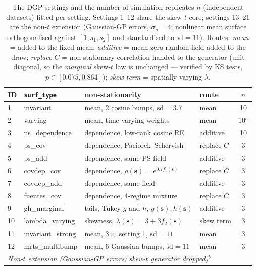 \documentclass[11pt]{article}
\newcommand{\bs}{\boldsymbol{s}}
\begin{document}
\begin{table}[ht]
\centering\small
\caption{The DGP settings and the number of simulation replicates
$n$ (independent datasets) fitted per setting. Settings 1--12 share the
skew-$t$ core; settings 13--21 are the non-$t$ extension (Gaussian-GP errors,
$\sigma_g = 4$; nonlinear mean surface orthogonalised against $[1,s_1,s_2]$
and standardised to $\mathrm{sd}=11$). Routes: \emph{mean} = added to
the fixed mean; \emph{additive} = mean-zero random field added to the draw;
\emph{replace $C$} = non-stationary correlation handed to the generator (unit
diagonal, so the \emph{marginal} skew-$t$ law is unchanged --- verified by KS
tests, $p \in [0.075, 0.864]$); \emph{skew term} = spatially varying $\lambda$.}
\label{tab:dgp}
\begin{tabular}{llllc}
\toprule
ID & \texttt{surf\_type} & non-stationarity & route & $n$ \\
\midrule
1  & invariant         & mean, 2 cosine bumps, $\mathrm{sd}=3.7$   & mean       & 10 \\
2  & varying           & mean, time-varying weights                & mean       & 10$^{a}$ \\
3  & ns\_dependence    & dependence, low-rank cosine RE            & additive   & 10 \\
4  & ps\_cov           & dependence, Paciorek--Schervish           & replace $C$& 3  \\
5  & ps\_add           & dependence, same PS field                 & additive   & 3  \\
6  & covdep\_cov       & dependence, $\rho(\bs)=e^{0.7 f_1(\bs)}$  & replace $C$& 3  \\
7  & covdep\_add       & dependence, same field                    & additive   & 3  \\
8  & fuentes\_cov      & dependence, 4-regime mixture              & replace $C$& 3  \\
9  & gh\_marginal      & tails, Tukey $g$-and-$h$, $g(\bs), h(\bs)$& additive   & 3  \\
10 & lambda\_varying   & skewness, $\lambda(\bs) = 3 + 3 f_2(\bs)$ & skew term  & 3  \\
11 & invariant\_strong & mean, $3\times$ setting 1, $\mathrm{sd}=11$ & mean     & 3  \\
12 & mrts\_multibump   & mean, 6 Gaussian bumps, $\mathrm{sd}=11$    & mean     & 3  \\
\midrule
\multicolumn{5}{l}{\emph{Non-$t$ extension (Gaussian-GP errors; skew-$t$ generator dropped)}$^{b}$} \\

\end{tabular}
\end{table}
\end{document}
